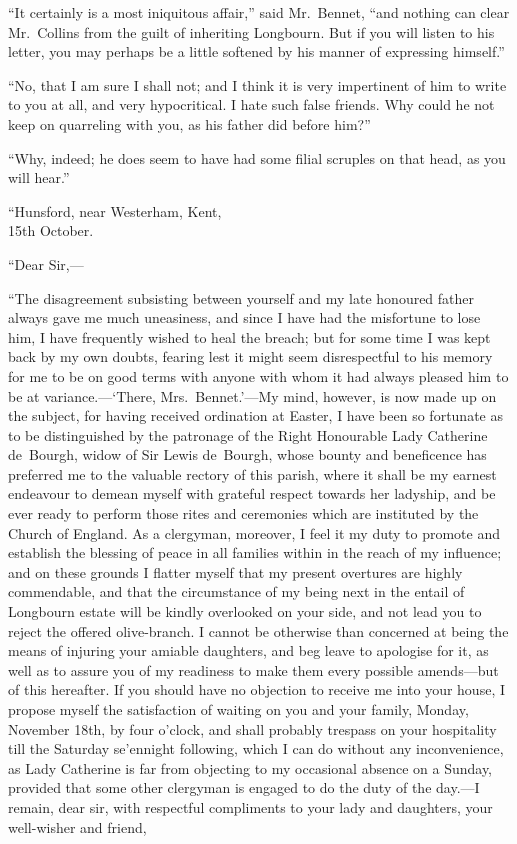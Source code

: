 ``It certainly is a most iniquitous affair,'' said Mr.\ Bennet,
``and nothing can clear Mr.\ Collins from the guilt of inheriting
Longbourn.  But if you will listen to his letter, you may perhaps
be a little softened by his manner of expressing himself.''

``No, that I am sure I shall not; and I think it is very impertinent
of him to write to you at all, and very hypocritical.  I hate such
false friends.  Why could he not keep on quarreling with you, as
his father did before him?''

``Why, indeed; he does seem to have had some filial scruples on
that head, as you will hear.''

\bigskip
``Hunsford, near Westerham, Kent,\\
15th October.
\medskip

``Dear Sir,---

``The disagreement subsisting between yourself and my late
honoured father always gave me much uneasiness, and since I
have had the misfortune to lose him, I have frequently wished
to heal the breach; but for some time I was kept back by my own
doubts, fearing lest it might seem disrespectful to his memory
for me to be on good terms with anyone with whom it had always
pleased him to be at variance.---`There, Mrs.\ Bennet.'---My
mind, however, is now made up on the subject, for having
received ordination at Easter, I have been so fortunate as to
be distinguished by the patronage of the Right Honourable Lady
Catherine de~Bourgh, widow of Sir Lewis de~Bourgh, whose
bounty and beneficence has preferred me to the valuable rectory
of this parish, where it shall be my earnest endeavour to demean
myself with grateful respect towards her ladyship, and be ever
ready to perform those rites and ceremonies which are instituted
by the Church of England.  As a clergyman,  moreover, I feel it
my duty to promote and establish the blessing of peace in all
families within in the reach of my influence; and on these
grounds I flatter myself that my present overtures are highly
commendable, and that the circumstance of my being next in the
entail of Longbourn estate will be kindly overlooked on your
side, and not lead you to reject the offered olive-branch.
I cannot be otherwise than concerned at being the means of
injuring your amiable daughters, and beg leave to apologise for
it, as well as to assure you of my readiness to make them every
possible amends---but of this hereafter.  If you should have
no objection to receive me into your house, I propose myself
the satisfaction of waiting on you and your family, Monday,
November 18th, by four o'clock, and shall probably trespass on
your hospitality till the Saturday se'ennight following, which I
can do without any inconvenience, as Lady Catherine is far from
objecting to my occasional absence on a Sunday, provided that
some other clergyman is engaged to do the duty of the day.---I
remain, dear sir, with respectful compliments to your lady and
daughters, your well-wisher and friend,

